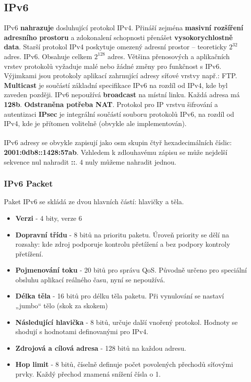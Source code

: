 \subsection*{IPv6}
IPv6 \textbf{nahrazuje} dosluhující protokol IPv4. Přináší zejména \textbf{masivní rozšíření adresního prostoru} a zdokonalení schopnosti přenášet \textbf{vysokorychlostně data}. Starší protokol IPv4 poskytuje omezený adresní prostor – teoreticky $2^32$ adres. IPv6. Obsahuje celkem $2^128$ adres. Většina přenosových a aplikačních vrstev protokolů vyžaduje malé nebo žádné změny pro funkčnost s IPv6. Výjimkami jsou protokoly aplikací zahrnující adresy síťové vrstvy např.: FTP. \textbf{Multicast} je součástí základní specifikace IPv6 na rozdíl od IPv4, kde byl zaveden později. IPv6 nepoužívá \textbf{broadcast} na místní linku. Každá adresa má \textbf{128b}. \textbf{Odstraněna potřeba NAT}. Protokol pro IP vrstvu šifrování a autentizaci \textbf{IPsec} je integrální součástí souboru protokolů IPv6, na rozdíl od IPv4, kde je přítomen volitelně (obvykle ale implementován).
\\\\
IPv6 adresy se obvykle zapisují jako osm skupin čtyř hexadecimálních číslic: \textbf{2001:0db8::1428:57ab}. Vzhledem k zdlouhavému zápisu se může nejdelší sekvence nul nahradit \textbf{::}. 4 nuly můžeme nahradit jednou.

\subsubsection*{IPv6 Packet}
Paket IPv6 se skládá ze dvou hlavních částí: hlavičky a těla.
\begin{itemize}
	\item \textbf{Verzi} - 4 bity, verze 6
	\item \textbf{Dopravní třídu} - 8 bitů na prioritu paketu. Úroveň priority se dělí na rozsahy: kde zdroj podporuje kontrolu přetížení a bez podpory kontroly přetížení.
	\item \textbf{Pojmenování toku} - 20 bitů pro správu QoS. Původně určeno pro speciální obsluhu aplikací reálného času, nyní se nepoužívá.
	\item \textbf{Délka těla} - 16 bitů pro délku těla paketu. Při vynulování se nastaví „jumbo“ tělo (skok za skokem)
	\item \textbf{Následující hlavička} - 8 bitů, určuje další vnořený protokol. Hodnoty se shodují s hodnotami definovanými pro IPv4.
	\item \textbf{Zdrojová a cílová adresa} - 128 bitů na každou adresu.
	\item\textbf{Hop limit }- 8 bitů, číselně definuje počet povolených přechodů síťovými prvky. Každý přechod znamená snížení čísla o 1.
\end{itemize}

\noindent{}
